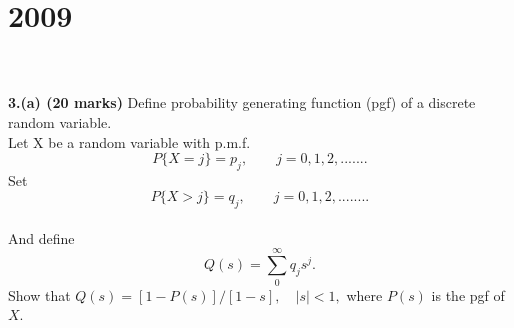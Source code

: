 \section*{2009}
\vspace{-.4cm}
\hrulefill \\\\
\textbf{3.(a) (20 marks)} Define probability generating function (pgf) of a discrete random variable.\\
Let X be a random variable with p.m.f.
\[P\{X = j\} = p_j , \qquad     j = 0, 1, 2, .......\]
Set \[P \{X > j\} = q_j , \qquad     j = 0, 1, 2, ........\]
\\
And define \[Q(s) = \sum_{0}^{\infty}q_j s^j. \]
Show that \(Q(s) = [1 - P(s)] / [1-s], \quad  | s | < 1,\) where \(P(s)\) is the pgf of $X$.



